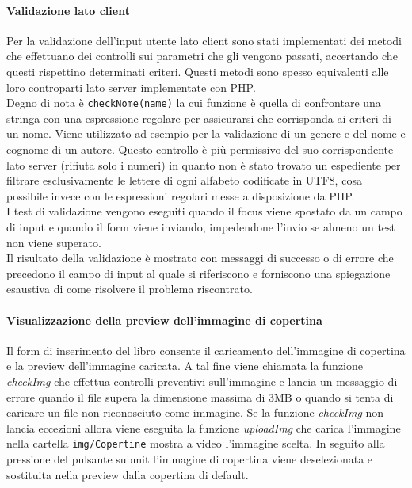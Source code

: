 \documentclass[12pt,a4paper,headings=optiontohead]{article}
\begin{document}
	\paragraph{Validazione lato client}
	Per la validazione dell'input utente lato client sono stati implementati dei metodi che effettuano dei controlli sui parametri che gli vengono passati, accertando che questi rispettino determinati criteri. Questi metodi sono spesso equivalenti alle loro controparti lato server implementate con PHP. \\
	Degno di nota è \texttt{checkNome(name)} la cui funzione è quella di confrontare una stringa con una espressione regolare per assicurarsi che corrisponda ai criteri di un nome. Viene utilizzato ad esempio per la validazione di un genere e del nome e cognome di un autore. Questo controllo è più permissivo del suo corrispondente lato server (rifiuta solo i numeri) in quanto non è stato trovato un espediente per filtrare esclusivamente le lettere di ogni alfabeto codificate in UTF8, cosa possibile invece con le espressioni regolari messe a disposizione da PHP.\\
	I test di validazione vengono eseguiti quando il focus viene spostato da un campo di input e quando il form viene inviando, impedendone l'invio se almeno un test non viene superato.\\
	Il risultato della validazione è mostrato con messaggi di successo o di errore che precedono il campo di input al quale si riferiscono e forniscono una spiegazione esaustiva di come risolvere il problema riscontrato.
	
	\paragraph{Visualizzazione della preview dell'immagine di copertina}
	
	Il form di inserimento del libro consente il caricamento dell'immagine di copertina e la preview dell'immagine caricata. A tal fine viene chiamata la funzione \textit{checkImg} che effettua controlli preventivi sull'immagine e lancia un messaggio di errore quando il file supera la dimensione massima di 3MB o quando si tenta di caricare un file non riconosciuto come immagine. Se la funzione \textit{checkImg} non lancia eccezioni allora viene eseguita la funzione \textit{uploadImg} che carica l'immagine nella cartella \texttt{img/Copertine} mostra a video l'immagine scelta. In seguito alla pressione del pulsante submit l'immagine di copertina viene deselezionata e sostituita nella preview dalla copertina di default.
	
\end{document}
